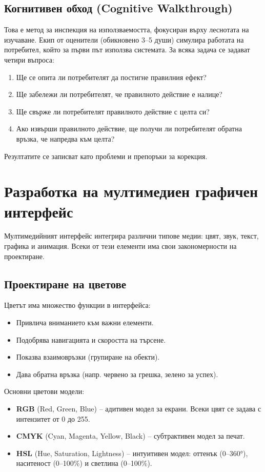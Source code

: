 \documentclass{scrartcl}
\begin{document}
\begin{FlushLeft}
\subsection{Когнитивен обход (Cognitive Walkthrough)}

Това е метод за инспекция на използваемостта, фокусиран върху леснотата на изучаване. Екип от оценители (обикновено 3–5 души) симулира работата на потребител, който за първи път използва системата. За всяка задача се задават четири въпроса:
\begin{enumerate}
    \item Ще се опита ли потребителят да постигне правилния ефект?
    \item Ще забележи ли потребителят, че правилното действие е налице?
    \item Ще свърже ли потребителят правилното действие с целта си?
    \item Ако извърши правилното действие, ще получи ли потребителят обратна връзка, че напредва към целта?
\end{enumerate}
Резултатите се записват като проблеми и препоръки за корекция.

\section{Разработка на мултимедиен графичен интерфейс}

Мултимедийният интерфейс интегрира различни типове медии: цвят, звук, текст, графика и анимация. Всеки от тези елементи има свои закономерности на проектиране.

\subsection{Проектиране на цветове}

Цветът има множество функции в интерфейса:
\begin{itemize}
    \item Привлича вниманието към важни елементи.
    \item Подобрява навигацията и скоростта на търсене.
    \item Показва взаимовръзки (групиране на обекти).
    \item Дава обратна връзка (напр. червено за грешка, зелено за успех).
\end{itemize}

Основни цветови модели:
\begin{itemize}
    \item \textbf{RGB} (Red, Green, Blue) – адитивен модел за екрани. Всеки цвят се задава с интензитет от 0 до 255.
    \item \textbf{CMYK} (Cyan, Magenta, Yellow, Black) – субтрактивен модел за печат.
    \item \textbf{HSL} (Hue, Saturation, Lightness) – интуитивен модел: оттенък (0–360°), наситеност (0–100\%) и светлина (0–100\%).
\end{itemize}


\end{FlushLeft}
\end{document}

